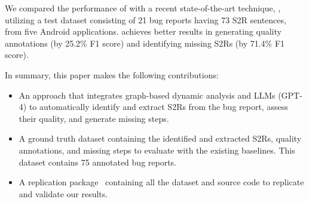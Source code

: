 We compared the performance of \tool with a recent state-of-the-art technique, \EulerC \cite{Chaparro2019}, utilizing a test dataset consisting of 21 bug reports having 73 S2R sentences, from five Android applications. 
\tool achieves better results in generating quality annotations (by 25.2\% F1 score) and identifying missing S2Rs (by 71.4\% F1 score).

In summary, this paper makes the following contributions:
\begin{itemize}
	\item An approach that integrates graph-based dynamic analysis and LLMs (\ie GPT-4) to automatically identify and extract S2Rs from the bug report, assess their quality, and generate missing steps. 
	\item A ground truth dataset containing the identified and extracted S2Rs, quality annotations, and missing steps to evaluate \tool with the existing baselines. This dataset contains 75 annotated bug reports.
	\item A replication package~\cite{package,doi} containing all the dataset and source code to replicate and validate our results.
\end{itemize}
